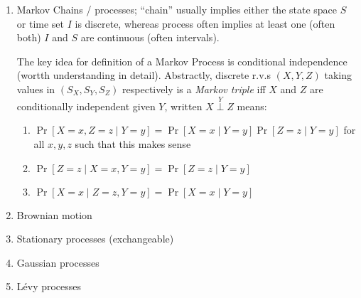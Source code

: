 \begin{enumerate}
    \item Markov Chains / processes; ``chain'' usually implies either
      the state space $S$ or time set $I$ is discrete, whereas
      process often implies at least one (often both) $I$ and $S$
      are continuous (often intervals).

      The key idea for definition of a Markov Process is conditional
      independence (wortth understanding in detail). Abstractly,
      discrete r.v.s $(X,Y,Z)$ taking values in $(S_X, S_Y, S_Z)$ respectively
      is a \emph{Markov triple} iff $X$ and $Z$ are conditionally independent
      given $Y$, written $X \overset{Y}{\perp} Z$ means:
      \begin{enumerate}
        \item $\Pr[X=x, Z=z \mid Y=y] = \Pr[X=x \mid Y=y] \Pr[Z=z \mid Y=y]$
          for all $x,y,z$ such that this makes sense
        \item $\Pr[Z=z \mid X=x, Y=y] = \Pr[Z=z \mid Y=y]$
        \item $\Pr[X=x \mid Z=z, Y=y] = \Pr[X=x \mid Y=y]$
      \end{enumerate}

    \item Brownian motion
    \item Stationary processes (exchangeable)
    \item Gaussian processes
    \item L\'evy processes
  \end{enumerate}
